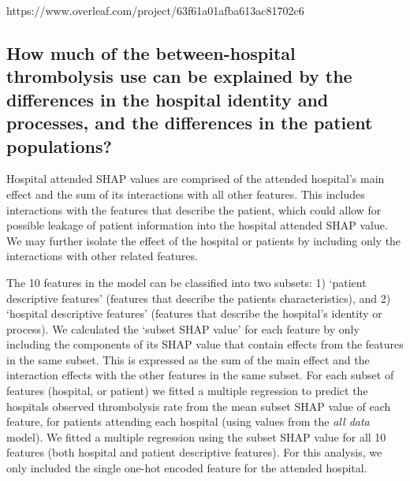 https://www.overleaf.com/project/63f61a01afba613ac81702c6

\subsection{How much of the between-hospital thrombolysis use can be explained by the differences in the hospital identity and processes, and the differences in the patient populations?}%


Hospital attended SHAP values are comprised of the attended hospital's main effect and the sum of its interactions with all other features. This includes interactions with the features that describe the patient, which could allow for possible leakage of patient information into the hospital attended SHAP value. We may further isolate the effect of the hospital or patients by including only the interactions with other related features.

The 10 features in the model can be classified into two subsets: 1) `patient descriptive features' (features that describe the patients characteristics), and 2) `hospital descriptive features' (features that describe the hospital’s identity or process). We calculated the `subset SHAP value' for each feature by only including the components of its SHAP value that contain effects from the features in the same subset. This is expressed as the sum of the main effect and the interaction effects with the other features in the same subset. For each subset of features (hospital, or patient) we fitted a multiple regression to predict the hospitals observed thrombolysis rate from the mean subset SHAP value of each feature, for patients attending each hospital (using values from the \emph{all data} model). We fitted a multiple regression using the subset SHAP value for all 10 features (both hospital and patient descriptive features). For this analysis, we only included the single one-hot encoded feature for the attended hospital. 

